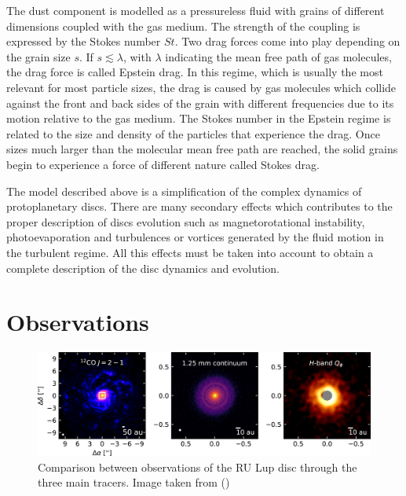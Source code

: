 \documentclass[a4paper,10pt]{report}
\begin{document}
The dust component is modelled as a pressureless fluid with grains of different dimensions coupled with the gas medium. 
The strength of the coupling is expressed by the Stokes number $St$.
Two drag forces come into play depending on the grain size $s$. 
If $s \lesssim \lambda$, with $\lambda$ indicating the mean free path of gas molecules, 
the drag force is called Epstein drag. 
In this regime, which is usually the most relevant for most particle sizes, 
the drag is caused by gas molecules which collide against the front and back sides of the grain with different 
frequencies due to its motion relative to the gas medium.
The Stokes number in the Epstein regime is related to the size and density of the particles that experience the drag.
Once sizes much larger than the molecular 
mean free path are reached, the solid grains begin to experience a force of different nature called Stokes drag.

The model described above is a simplification of the complex dynamics of protoplanetary discs. 
There are many secondary effects
which contributes to the proper description of discs evolution such as magnetorotational instability, photoevaporation and 
turbulences or vortices generated by the fluid motion in the turbulent regime. All 
this effects must be taken into account to obtain a complete description of the disc dynamics and evolution.

\section{Observations}

\begin{figure}
    \begin{center}
        \includegraphics[width=\textwidth]{images/2.2.tracers.comparison/apjaba1e1f9_hr.jpg}
    \end{center}
    \caption{Comparison between observations of the RU Lup disc through the three main tracers.
    Image taken from ()}
\end{figure}
\end{document}
